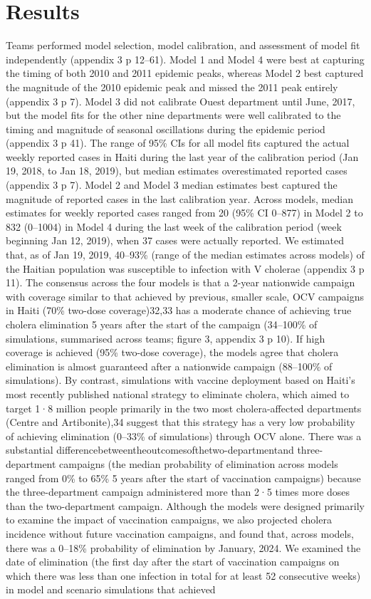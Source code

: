       \section{Results}
      Teams performed model selection, model calibration, and assessment of model fit independently (appendix 3 p 12–61). Model 1 and Model 4 were best at capturing the timing of both 2010 and 2011 epidemic peaks, whereas Model 2 best captured the magnitude of the 2010 epidemic peak and missed the 2011 peak entirely (appendix 3 p 7). Model 3 did not calibrate Ouest department until June, 2017, but the model fits for the other nine departments were well calibrated to the timing and magnitude of seasonal oscillations during the epidemic period (appendix 3 p 41). The range of 95\% CIs for all model fits captured the actual weekly reported cases in Haiti during the last year of the calibration period (Jan 19, 2018, to Jan 18, 2019), but median estimates overestimated reported cases (appendix 3 p 7). Model 2 and Model 3 median estimates best captured the magnitude of reported cases in the last calibration year. Across models, median estimates for weekly reported cases ranged from 20 (95\% CI 0–877) in Model 2 to 832 (0–1004) in Model 4 during the last week of the calibration period (week beginning Jan 12, 2019), when 37 cases were actually reported. We estimated that, as of Jan 19, 2019, 40–93\% (range of the median estimates across models) of the Haitian population was susceptible to infection with V cholerae (appendix 3 p 11). The consensus across the four models is that a 2-year nationwide campaign with coverage similar to that achieved by previous, smaller scale, OCV campaigns in Haiti (70\% two-dose coverage)32,33 has a moderate chance of achieving true cholera elimination 5 years after the start of the campaign (34–100\% of simulations, summarised across teams; figure 3, appendix 3 p 10). If high coverage is achieved (95\% two-dose coverage), the models agree that cholera elimination is almost guaranteed after a nationwide campaign (88–100\% of simulations). By contrast, simulations with vaccine deployment based on Haiti’s most recently published national strategy to eliminate cholera, which aimed to target 1·8 million people primarily in the two most cholera-affected departments (Centre and Artibonite),34 suggest that this strategy has a very low probability of achieving elimination (0–33\% of simulations) through OCV alone. There was a substantial differencebetweentheoutcomesofthetwo-departmentand three-department campaigns (the median probability of elimination across models ranged from 0\% to 65\% 5 years after the start of vaccination campaigns) because the three-department campaign administered more than 2·5 times more doses than the two-department campaign. Although the models were designed primarily to examine the impact of vaccination campaigns, we also projected cholera incidence without future vaccination campaigns, and found that, across models, there was a 0–18\% probability of elimination by January, 2024. We examined the date of elimination (the first day after the start of vaccination campaigns on which there was less than one infection in total for at least 52 consecutive weeks) in model and scenario simulations that achieved 